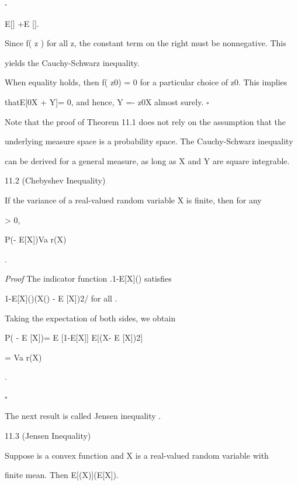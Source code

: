 \vert\vert\vert

- \vertE[X*Y]

E[\vertX{}] +E [\vertY{}].

Since f( z ) for all z, the constant term on the right must be nonnegative. This

yields the Cauchy-Schwarz inequality.

When equality holds, then f( z0) = 0 for a particular choice of z0. This implies

thatE[\vertz0X + Y]= 0, and hence, Y =- z0X almost surely. \hfill $\square$

Note that the proof of Theorem 11.1 does not rely on the assumption that the

underlying measure space is a probability space. The Cauchy-Schwarz inequality

can be derived for a general measure, as long as X and Y are square integrable.

\begin{thmbox}{11.2 (Chebyshev Inequality)}
\end{thmbox}

If the variance of a real-valued random variable X is finite, then for any

\epsilon> 0,

P(\vertX - E[X]\vert \geq \epsilon)\leq Va r(X)

 .

\textit{Proof} The indicator function .1{\vertX-E[X]\vert\geq\epsilon}() satisfies

1{\vertX-E[X]\vert\geq\epsilon}()\leq (X() - E [X])2/ for all \in \Omega.

Taking the expectation of both sides, we obtain

P( \vertX- E [X]\vert \geq\epsilon)= E [1{\vertX-E[X]\vert\geq\epsilon}] \leq E[(X- E [X])2]

 = Va r(X)

 .

\hfill $\square$

The next result is called Jensen inequality .

\begin{thmbox}{11.3 (Jensen Inequality)}
\end{thmbox}

Suppose \phi is a convex function and X is a real-valued random variable with

finite mean. Then E[\phi(X)]\geq \phi(E[X]).

